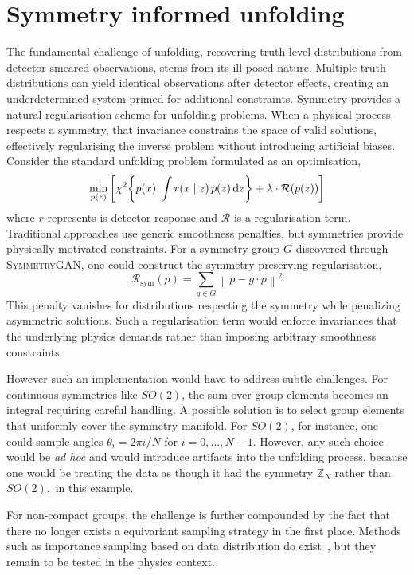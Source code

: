 \section{Symmetry informed unfolding}
\label{sec:symmetry-informed-unfolding}
    The fundamental challenge of unfolding, recovering truth level distributions from detector smeared observations, stems from its ill posed nature.
    Multiple truth distributions can yield identical observations after detector effects, creating an underdetermined system primed for additional constraints.
    Symmetry provides a natural regularisation scheme for unfolding problems.
    When a physical process respects a symmetry, that invariance constrains the space of valid solutions, effectively regularising the inverse problem without introducing artificial biases.
    Consider the standard unfolding problem formulated as an optimisation,
    \[
        \min_{p(z)} \left[ \chi^2\qty{p(x), \int r(x\mid z) \, p(z)\,\dd z} + \lambda \cdot \mathcal{R}(p(z)) \right]
    \]
    where \(r\) represents is detector response and \(\mathcal{R}\) is a regularisation term.
    Traditional approaches use generic smoothness penalties, but symmetries provide physically motivated constraints.
    For a symmetry group \(G\) discovered through \textsc{SymmetryGAN}, one could construct the symmetry preserving regularisation,
    \[
        \mathcal{R}_\text{sym}(p) = \sum_{g \in G} \left\| p - g \cdot p \right\|^2
    \]
    This penalty vanishes for distributions respecting the symmetry while penalizing asymmetric solutions.
    Such a regularisation term would enforce invariances that the underlying physics demands rather than imposing arbitrary smoothness constraints.
    
    However such an implementation would have to address subtle challenges.
    For continuous symmetries like \(SO(2)\), the sum over group elements becomes an integral requiring careful handling.
    A possible solution is to select group elements that uniformly cover the symmetry manifold.
    For \(SO(2)\), for instance, one could sample angles \(\theta_i = 2\pi i/N\) for \(i = 0, ..., N-1\).
    However, any such choice would be \textit{ad hoc} and would introduce artifacts into the unfolding process, because one would be treating the data as though it had the symmetry \(\mathbb{Z}_N\) rather than \(SO(2),\) in this example.

    For non-compact groups, the challenge is further compounded by the fact that there no longer exists a equivariant sampling strategy in the first place.
    Methods such as importance sampling based on data distribution do exist~\cite{goertzel_quota_1949}, but they remain to be tested in the physics context.
    
